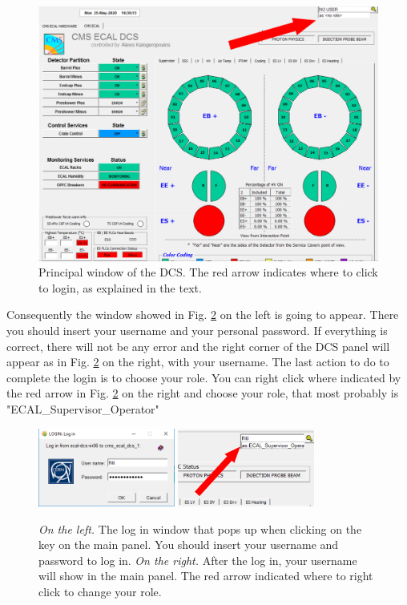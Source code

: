 \documentclass[12pt]{article}
\begin{document}
\begin{figure}[!h]
	\centering
	\includegraphics[width=1\textwidth]{Pics/Principal_witharrow}
	\caption{Principal window of the DCS. The red arrow indicates where to click to login, as explained in the text. }
	\label{fig:mainpanel}
\end{figure}

Consequently the window showed in Fig. \ref{fig:access} on the left is going to appear. There you should insert your username and your personal password. If everything is correct, there will not be any error and the right corner of the DCS panel will appear as in Fig. \ref{fig:access} on the right, with your username. The last action to do to complete the login is to choose your role. You can right click where indicated by the red arrow in Fig. \ref{fig:access} on the right and choose your role, that most probably is "ECAL\_Supervisor\_Operator"

\begin{figure}[!h]
	\centering
	\includegraphics[width=0.4\textwidth]{Pics/login1}
	\quad
	\includegraphics[width=0.4\textwidth]{Pics/login2_witharrow}
	\caption{\textit{On the left.} The log in window that pops up when clicking on the key on the main panel. You should insert your username and password to log in. \textit{On the right.} After the log in, your username will show in the main panel. The red arrow indicated where to right click to change your role.}
	\label{fig:access}
\end{figure}
\end{document}
